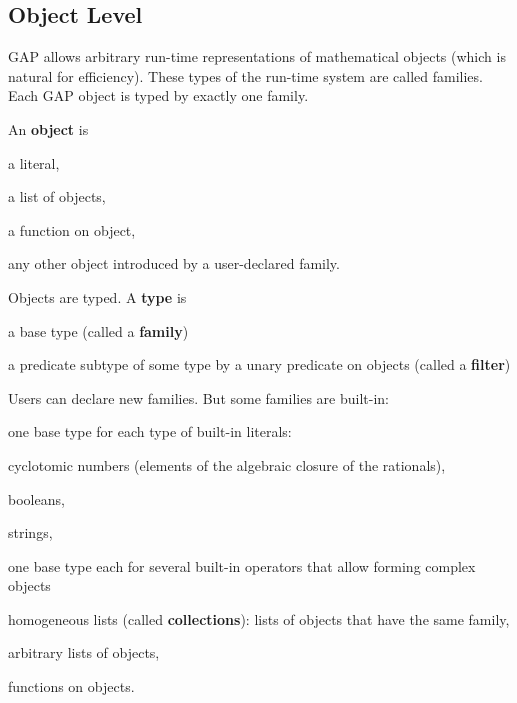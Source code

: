 \subsection{Object Level}

GAP allows arbitrary run-time representations of mathematical objects (which is natural for efficiency).
These types of the run-time system are called families.
Each GAP object is typed by exactly one family.

An \textbf{object} is
\begin{compactitem}
  \item a literal,
  \item a list of objects,
  \item a function on object,
  \item any other object introduced by a user-declared family.
\end{compactitem}

Objects are typed.
A \textbf{type} is
\begin{compactitem}
  \item a base type (called a \textbf{family})
  \item a predicate subtype of some type by a unary predicate on objects (called a \textbf{filter})
\end{compactitem}

Users can declare new families.
But some families are built-in:
\begin{compactitem}
  \item one base type for each type of built-in literals:
    \begin{compactitem}
      \item cyclotomic numbers (elements of the algebraic closure of the rationals),
      \item booleans,
      \item strings,
    \end{compactitem}
  \item one base type each for several built-in operators that allow forming complex objects
    \begin{compactitem}
      \item homogeneous lists (called \textbf{collections}): lists of objects that have the same family,
      \item arbitrary lists of objects,
      \item functions on objects.
    \end{compactitem}
\end{compactitem}

